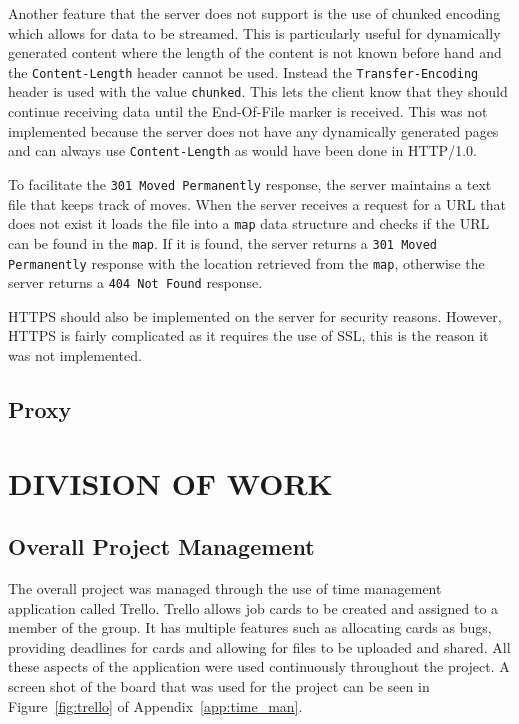 \documentclass[10pt,twocolumn]{witseiepaper}
\begin{document}
	Another feature that the server does not support is the use of chunked encoding which allows for data to be streamed. This is particularly useful for dynamically generated content where the length of the content is not known before hand and the \texttt{Content-Length} header cannot be used. Instead the \texttt{Transfer-Encoding} header is used with the value \texttt{chunked}. This lets the client know that they should continue receiving data until the End-Of-File marker is received. This was not implemented because the server does not have any dynamically generated pages and can always use \texttt{Content-Length} as would have been done in HTTP/1.0.

	To facilitate the \texttt{301 Moved Permanently} response, the server maintains a text file that keeps track of moves. When the server receives a request for a URL that does not exist it loads the file into a \texttt{map} data structure and checks if the URL can be found in the \texttt{map}. If it is found, the server returns a \texttt{301 Moved Permanently} response with the location retrieved from the \texttt{map}, otherwise the server returns a \texttt{404 Not Found} response.	

	HTTPS should also be implemented on the server for security reasons. However, HTTPS is fairly complicated as it requires the use of SSL, this is the reason it was not implemented. 

	\subsection{Proxy}

\section{DIVISION OF WORK}

	\subsection{Overall Project Management}
	
		The overall project was managed through the use of time management application called Trello. Trello allows job cards to be created and assigned to a member of the group. It has multiple features such as allocating cards as bugs, providing deadlines for cards and allowing for files to be uploaded and shared. All these aspects of the application were used continuously throughout the project. A screen shot of the board that was used for the project can be seen in Figure~\ref{fig:trello} of Appendix~\ref{app:time_man}. \\
		
\end{document}
